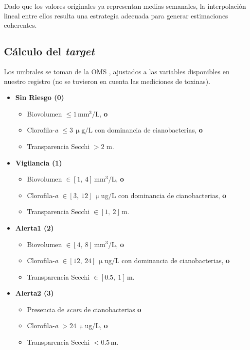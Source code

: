 \documentclass[
  11pt,
  pdftitle=TFI - Tschopp Joaquín S.,
  pdfauthor=Tschopp Joaquín S.,
  pdfcreator=LaTeX with hyperref,
]{report}  %
\begin{document}
Dado que los valores originales ya representan medias semanales, la interpolación lineal entre ellos resulta una estrategia adecuada para generar estimaciones coherentes.


\subsection{Cálculo del \textit{target}}
Los umbrales se toman de la OMS \citep{WHO2021}, ajustados a las
variables disponibles en nuestro registro (no se tuvieron en cuenta las mediciones de toxinas).

\begin{itemize}[leftmargin=*]
  \item \textbf{Sin Riesgo (0)}
        \begin{itemize}[noitemsep]
            \item Biovolumen $\leq 1\,\mathrm{mm}^3/\mathrm{L}$, \textbf{o}
            \item Clorofila-\emph{a} $\leq 3\,\upmu\mathrm{g}/\mathrm{L}$ con dominancia de cianobacterias, \textbf{o}
            \item Transparencia Secchi $> 2$ m.
        \end{itemize}

        
  \item \textbf{Vigilancia (1)}
        \begin{itemize}[noitemsep]
          \item Biovolumen $\in [1,\ 4]$\,mm$^{3}$/L, \textbf{o}
          \item Clorofila‑\emph{a} $\in [3,\ 12]$\,$\upmu$ug/L con dominancia de cianobacterias, \textbf{o}
          \item Transparencia Secchi $\in [1,\ 2]$\,m.
        \end{itemize}

  \item \textbf{Alerta1 (2)}
        \begin{itemize}[noitemsep]
          \item Biovolumen $\in [4,\ 8] $\,mm$^{3}$/L, \textbf{o}
          \item Clorofila‑\emph{a} $\in [12,\ 24] $\,$\upmu$ug/L con dominancia de cianobacterias, \textbf{o}
          \item Transparencia Secchi $\in [0.5,\ 1] $\,m.
        \end{itemize}

  \item \textbf{Alerta2 (3)}
        \begin{itemize}[noitemsep]
          \item Presencia de \emph{scum} de cianobacterias \textbf{o}
          \item Clorofila‑\emph{a} $> 24$\,$\upmu$ug/L, \textbf{o}
          \item Transparencia Secchi $< 0.5$\,m.
        \end{itemize}
\end{itemize}
\end{document}
